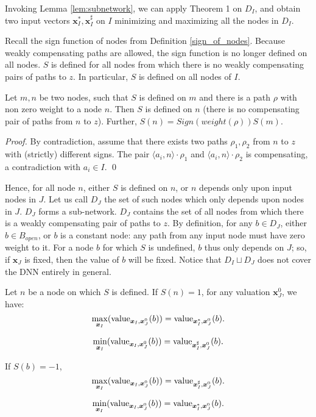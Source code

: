 			
			Invoking Lemma \ref{lem:subnetwork}, we can apply Theorem 1 on $D_I$, and obtain two input vectors $\boldsymbol{x}_I^*,\boldsymbol{x}_I^{\sharp}$ on $I$
			minimizing and maximizing all the nodes in $D_I$.

			\smallskip

		
			Recall the sign function of nodes from Definition \ref{sign_of_nodes}. 
			Because weakly compensating paths are allowed, the sign function is no longer defined on all nodes. $S$ is defined for all nodes from which there is no weakly compensating pairs of paths to $z$. In particular, $S$ is defined on all nodes of $I$.

			\begin{lemma}\label{lem:sign}
				Let $m,n$ be two nodes, such that $S$ is defined on $m$ and there is a path $\rho$ with non zero weight to a node $n$. Then $S$ is defined on $n$
				 (there is no compensating pair of paths from $n$ to $z$).
				Further, $S(n)= Sign(weight(\rho)) S(m)$.
			\end{lemma}
			
			\begin{proof}
				By contradiction, assume that there exists two paths $\rho_1,\rho_2$ from 
				$n$ to $z$ with (strictly) different signs. The pair $\langle a_i,n\rangle \cdot \rho_1$ and $\langle a_i,n\rangle \cdot \rho_2$ is compensating, a contradiction with $a_i\in I$. \qed
			\end{proof}

			Hence, for all node $n$, either $S$ is defined on $n$, or 
			$n$ depends only upon input nodes in $J$.
			Let us call $D_J$ the set of such nodes which only depends upon nodes in $J$.
			$D_J$ forms a sub-network.
			$D_J$ contains the set of all nodes from which there is a weakly compensating pair of paths to $z$.
			By definition, for any $b\in D_J$, either $b\in B_{open}$, or $b$ is a constant node: any path from any input node must have zero weight to it.
			For a node $b$ for which $S$ is undefined, $b$ thus only depends on $J$; so, if $\boldsymbol{x}_J$ is fixed, then the value of $b$ will be fixed.
			Notice that $D_I \sqcup D_J$ does not cover the DNN entirely in general.
			
			
			
			\begin{lemma} \label{lem:reach_max_2}
				Let $n$ be a node on which $S$ is defined. If $S(n)=1$,
				for any valuation $\boldsymbol{x}^0_J$,	we have: 
				$$\max_{\boldsymbol{x}_I} ({\textrm{value}}_{\boldsymbol{x}_I,\boldsymbol{x}^0_J}(b)) =  {\textrm{value}}_{\boldsymbol{x}_I^*,\boldsymbol{x}^0_J}(b).$$
				
				$$\min_{\boldsymbol{x}_I} ({\textrm{value}}_{\boldsymbol{x}_I,\boldsymbol{x}^0_J}(b)) =  {\textrm{value}}_{\boldsymbol{x}_I^{\sharp},\boldsymbol{x}^0_J}(b).$$
				
				
				If $S(b)=-1$, 
				$$\max_{\boldsymbol{x}_I} ({\textrm{value}}_{\boldsymbol{x}_I,\boldsymbol{x}^0_J}(b)) =  {\textrm{value}}_{\boldsymbol{x}_I^{\sharp},\boldsymbol{x}^0_J}(b).$$
				
				$$\min_{\boldsymbol{x}_I} ({\textrm{value}}_{\boldsymbol{x}_I,\boldsymbol{x}^0_J}(b)) =  {\textrm{value}}_{\boldsymbol{x}_I^{*},\boldsymbol{x}^0_J}(b).$$	
			\end{lemma}
			
